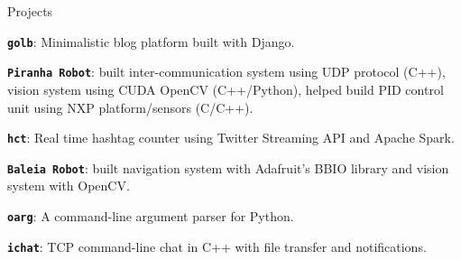 \documentclass[8pt]{resume}
\newcommand{\tbf}[1]{\textbf{#1}}
\newcommand{\ttt}[1]{\texttt{#1}}
\begin{document}
\begin{rSection}{Projects}
\begin{rSubsection}{}{}{}{}
    \vspace{-0.5em}
    \item \tbf{\ttt{golb}}: Minimalistic blog platform built with Django.
    \item \tbf{\ttt{Piranha Robot}}:
        built inter-communication system using UDP protocol (C++),
        vision system using CUDA OpenCV (C++/Python),
        helped build PID control unit using NXP platform/sensors (C/C++).
    \item \tbf{\ttt{hct}}: Real time hashtag counter using Twitter Streaming API and
        Apache Spark.
    \item \tbf{\ttt{Baleia Robot}}:
        built navigation system with Adafruit's BBIO library and
        vision system with OpenCV.
    \item \tbf{\ttt{oarg}}: A command-line argument parser for Python.
    \item \tbf{\ttt{ichat}}: TCP command-line chat in C++ with file transfer and
        notifications.
\end{rSubsection}

\end{rSection}
\end{document}
